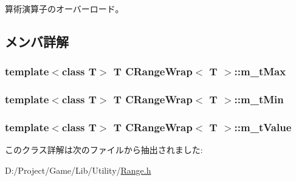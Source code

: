 算術演算子のオーバーロード。 



\subsection{メンバ詳解}
\hypertarget{class_c_range_wrap_a0b9c62d9d951a41451ddb2d21cd0e3ea}{}
\subsubsection[{m\+\_\+t\+Max}]{\setlength{\rightskip}{0pt plus 5cm}template$<$class T$>$ T {\bf C\+Range\+Wrap}$<$ T $>$\+::m\+\_\+t\+Max\hspace{0.3cm}{\ttfamily [private]}}\label{class_c_range_wrap_a0b9c62d9d951a41451ddb2d21cd0e3ea}
\hypertarget{class_c_range_wrap_a077162f05d9209550444ddc0542e18b2}{}
\subsubsection[{m\+\_\+t\+Min}]{\setlength{\rightskip}{0pt plus 5cm}template$<$class T$>$ T {\bf C\+Range\+Wrap}$<$ T $>$\+::m\+\_\+t\+Min\hspace{0.3cm}{\ttfamily [private]}}\label{class_c_range_wrap_a077162f05d9209550444ddc0542e18b2}
\hypertarget{class_c_range_wrap_ac36a6b05362a1f2483ad7eb579efb0e4}{}
\subsubsection[{m\+\_\+t\+Value}]{\setlength{\rightskip}{0pt plus 5cm}template$<$class T$>$ T {\bf C\+Range\+Wrap}$<$ T $>$\+::m\+\_\+t\+Value\hspace{0.3cm}{\ttfamily [private]}}\label{class_c_range_wrap_ac36a6b05362a1f2483ad7eb579efb0e4}


このクラス詳解は次のファイルから抽出されました\+:\begin{DoxyCompactItemize}
\item 
D\+:/\+Project/\+Game/\+Lib/\+Utility/\hyperlink{_range_8h}{Range.\+h}\end{DoxyCompactItemize}
